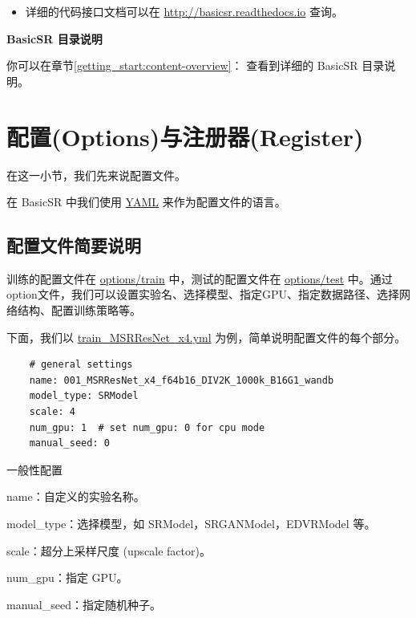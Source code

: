 \documentclass[../main.tex]{subfiles}
\begin{document}
\begin{itemize}
    \item 详细的代码接口文档可以在 \url{http://basicsr.readthedocs.io} 查询。
\end{itemize}

\begin{note} %
    \textbf{BasicSR 目录说明}

    你可以在章节\ref{getting_start:content-overview}： 查看到详细的 BasicSR 目录说明。
\end{note}

\section{配置(Options)与注册器(Register)}\label{code_structure:register}
在这一小节，我们先来说配置文件。

在 BasicSR 中我们使用 \href{https://yaml.org/}{YAML} 来作为配置文件的语言。

    \subsection{配置文件简要说明}
    训练的配置文件在 \href{https://github.com/XPixelGroup/BasicSR/tree/master/options/train}{options/train} 中，测试的配置文件在 \href{https://github.com/XPixelGroup/BasicSR/tree/master/options/test}{options/test} 中。通过option文件，我们可以设置实验名、选择模型、指定GPU、指定数据路径、选择网络结构、配置训练策略等。

    下面，我们以 \href{https://github.com/XPixelGroup/BasicSR/blob/master/options/train/SRResNet_SRGAN/train_MSRResNet_x4.yml}{train\_MSRResNet\_x4.yml} 为例，简单说明配置文件的每个部分。

    \begin{verbatim}
    # general settings
    name: 001_MSRResNet_x4_f64b16_DIV2K_1000k_B16G1_wandb
    model_type: SRModel
    scale: 4
    num_gpu: 1  # set num_gpu: 0 for cpu mode
    manual_seed: 0
    \end{verbatim}
    \begin{exampleBox}[righthand ratio=0.00, sidebyside, sidebyside align=center, lower separated=false]{一般性配置}

    name：自定义的实验名称。

    model\_type：选择模型，如 SRModel，SRGANModel，EDVRModel 等。

    scale：超分上采样尺度 (upscale factor)。

    num\_gpu：指定 GPU。

    manual\_seed：指定随机种子。
    \end{exampleBox}
\end{document}
